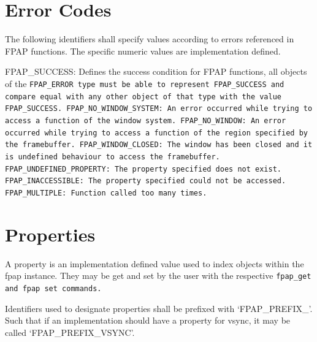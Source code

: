 \section{Error Codes}

\noindent The following identifiers shall specify values according to errors
referenced in FPAP functions. The specific numeric values are implementation
defined.

\error FPAP\_SUCCESS: Defines the success condition for FPAP functions, all
objects of the \tt FPAP\_ERROR \rm type must be able to represent
\tt FPAP\_SUCCESS \rm and compare equal with any other object of that type with
the value \tt FPAP\_SUCCESS\rm.
\error FPAP\_NO\_WINDOW\_SYSTEM: An error occurred while trying to access a
function of the window system.
\error FPAP\_NO\_WINDOW: An error occurred while trying to access a function
of the region specified by the framebuffer.
\error FPAP\_WINDOW\_CLOSED: The window has been closed and it is undefined
behaviour to access the framebuffer.
\error FPAP\_UNDEFINED\_PROPERTY: The property specified does not exist.
\error FPAP\_INACCESSIBLE: The property specified could not be accessed.
\error FPAP\_MULTIPLE: Function called too many times.

\section{Properties}

\noindent A property is an implementation defined value used to index objects
within the fpap instance. They may be get and set by the user with the
respective \tt fpap\_get \rm and \tt fpap set \rm commands.

Identifiers used to designate properties shall be prefixed with
`FPAP\_PREFIX\_'. Such that if an implementation should have a property for
vsync, it may be called `FPAP\_PREFIX\_VSYNC'.

\vfill\break
